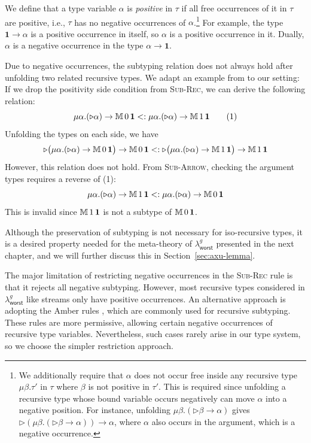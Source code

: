 We define that a type variable $\alpha$ is \emph{positive} in $\tau$ if all free occurrences of it in $\tau$ are positive, i.e., $\tau$ has no negative occurrences of $\alpha$.\footnote{We additionally require that $\alpha$ does not occur free inside any recursive type $\mu\beta.\tau'$ in $\tau$ 
where $\beta$ is not positive in $\tau'$. 
This is required since unfolding a recursive type whose bound variable occurs negatively can move $\alpha$ into a negative position. For instance,
unfolding $\mu\beta.(\triangleright\beta \to \alpha)$ gives $\triangleright(\mu\beta.(\triangleright\beta \to \alpha)) \to \alpha$, where $\alpha$ also occurs in the argument, which is a negative occurrence.}
For example, the type $\textbf{1} \to \alpha$ is a positive occurrence in itself, so $\alpha$ is a positive occurrence in it. Dually, 
$\alpha$ is a negative occurrence in the type $\alpha \to \textbf{1}$.

Due to negative occurrences, the subtyping relation does not always hold after unfolding two related recursive types. We adapt an example from \cite{zhouRevisitingIsorecursiveSubtyping2020} to our setting:
If we drop the positivity side condition from \textsc{Sub-Rec}, we can derive the following relation:
\[\mu \alpha.(\triangleright\alpha) \to \mathbb{M}\,{0}\, \textbf{1} <: \mu \alpha.(\triangleright\alpha) \to \mathbb{M}\,{1}\, \textbf{1} \qquad (1)\]
Unfolding the types on each side, we have
\[
  \triangleright\big(\mu \alpha.(\triangleright\alpha)\to\mathbb{M}\,{0}\, \textbf{1}\big)\to\mathbb{M}\,{0}\, \textbf{1} 
  <:
  \triangleright\big(\mu \alpha.(\triangleright\alpha)\to\mathbb{M}\,{1}\, \textbf{1}\big)\to\mathbb{M}\,{1}\, \textbf{1} 
\]
However, this relation does not hold. From \textsc{Sub-Arrow}, checking the argument types requires a reverse of (1):
\[\mu \alpha.(\triangleright\alpha) \to \mathbb{M}\,{1}\, \textbf{1} <: \mu \alpha.(\triangleright\alpha) \to \mathbb{M}\,{0}\, \textbf{1}\]
This is invalid since $\mathbb{M}\,{1}\, \textbf{1}$ is not a subtype of $\mathbb{M}\,{0}\, \textbf{1}$.

Although the preservation of subtyping is not necessary for iso-recursive types, it is a desired property needed for the meta-theory of 
$\lambda^g_{\mathsf{worst}}$ presented in the next chapter, and we will further discuss this in Section~\ref{sec:axu-lemma}.

The major limitation of restricting negative occurrences in the \textsc{Sub-Rec} rule is that it rejects all negative subtyping. However, most recursive types considered in 
$\lambda^g_{\mathsf{worst}}$ like streams only have positive occurrences. An alternative approach is adopting the Amber rules \citep{cardelli85}, which are commonly used for recursive subtyping. These rules are more permissive, allowing certain negative occurrences of recursive type variables. Nevertheless, such cases rarely arise in our type system, so we
choose the simpler restriction approach.

